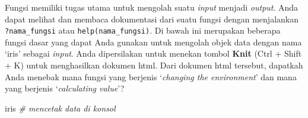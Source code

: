 \documentclass[]{article}
\newenvironment{Shaded}{\begin{snugshade}}{\end{snugshade}}
\newcommand{\CommentTok}[1]{\textcolor[rgb]{0.56,0.35,0.01}{\textit{#1}}}
\newcommand{\NormalTok}[1]{#1}
\begin{document}
Fungsi memiliki tugas utama untuk mengolah suatu \emph{input} menjadi
\emph{output}. Anda dapat melihat dan membaca dokumentasi dari suatu
fungsi dengan menjalankan \texttt{?nama\_fungsi} atau
\texttt{help(nama\_fungsi)}. Di bawah ini merupakan beberapa fungsi
dasar yang dapat Anda gunakan untuk mengolah objek data dengan nama
`iris' sebagai \emph{input}. Anda dipersilakan untuk menekan tombol
\textbf{Knit} (Ctrl + Shift + K) untuk menghasilkan dokumen html. Dari
dokumen html tersebut, dapatkah Anda menebak mana fungsi yang berjenis
`\emph{changing the environment}' dan mana yang berjenis
`\emph{calculating value}'?

\begin{Shaded}
\begin{Highlighting}[]
\NormalTok{iris }\CommentTok{# mencetak data di konsol}
\end{Highlighting}
\end{Shaded}
\end{document}
